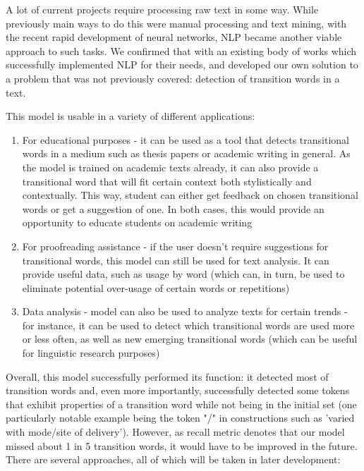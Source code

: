 A lot of current projects require processing raw text in some way. While previously main ways to do this were manual processing and text mining, with the recent rapid development of neural networks, NLP became another viable approach to such tasks. We confirmed that with an existing body of works which successfully implemented NLP for their needs, and developed our own solution to a problem that was not previously covered: detection of transition words in a text.

This model is usable in a variety of different applications:
\begin{enumerate}
    \item For educational purposes - it can be used as a tool that detects transitional words in a medium such as thesis papers or academic writing in general. As the model is trained on academic texts already, it can also provide a transitional word that will fit certain context both stylistically and contextually. This way, student can either get feedback on chosen transitional words or get a suggestion of one. In both cases, this would provide an opportunity to educate students on academic writing
    \item For proofreading assistance - if the user doesn't require suggestions for transitional words, this model can still be used for text analysis. It can provide useful data, such as usage by word (which can, in turn, be used to eliminate potential over-usage of certain words or repetitions)
    \item Data analysis - model can also be used to analyze texts for certain trends - for instance, it can be used to detect which transitional words are used more or less often, as well as new emerging transitional words (which can be useful for linguistic research purposes)
\end{enumerate}

Overall, this model successfully performed its function: it detected most of transition words and, even more importantly, successfully detected some tokens that exhibit properties of a transition word while not being in the initial set (one particularly notable example being the token "/" in constructions such as 'varied with mode/site of delivery'). However, as recall metric denotes that our model missed about 1 in 5 transition words, it would have to be improved in the future. There are several approaches, all of which will be taken in later development:

